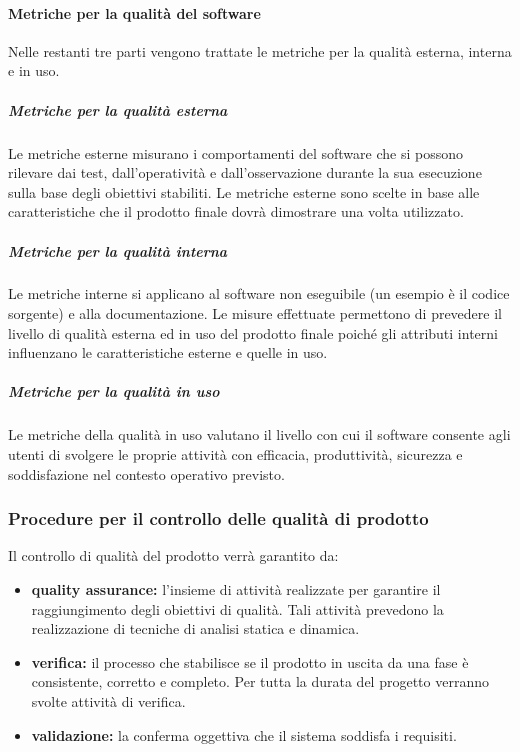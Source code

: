 			\paragraph{Metriche per la qualità del software}
			Nelle restanti tre parti vengono trattate le metriche per la qualità esterna, interna e in uso.
				\subparagraph{Metriche per la qualità esterna}
				Le metriche esterne misurano i comportamenti del software che si possono rilevare dai test, dall'operatività e dall'osservazione durante la sua esecuzione sulla base degli obiettivi stabiliti. Le metriche esterne sono scelte in base alle caratteristiche che il prodotto finale dovrà dimostrare una volta utilizzato.
				\subparagraph{Metriche per la qualità interna}
				Le metriche interne si applicano al software non eseguibile (un esempio è il codice sorgente) e alla documentazione. Le misure effettuate permettono di prevedere il livello di qualità esterna ed in uso del prodotto finale poiché gli attributi interni influenzano le caratteristiche esterne e quelle in uso.
				\subparagraph{Metriche per la qualità in uso}
				Le metriche della qualità in uso valutano il livello con cui il software consente agli utenti di svolgere le proprie attività con efficacia, produttività, sicurezza e soddisfazione nel contesto operativo previsto.
		\subsubsection{Procedure per il controllo delle qualità di prodotto}
		Il controllo di qualità del prodotto verrà garantito da:
		\begin{itemize}
			\item \textbf{quality assurance:} l'insieme di attività realizzate per garantire il raggiungimento degli obiettivi di qualità. Tali attività prevedono la realizzazione di tecniche di analisi statica e dinamica.
			\item \textbf{verifica:} il processo che stabilisce se il prodotto in uscita da una fase è consistente, corretto e completo. Per tutta la durata del progetto verranno svolte attività di verifica.
			\item \textbf{validazione:} la conferma oggettiva che il sistema soddisfa i requisiti.
		\end{itemize}
